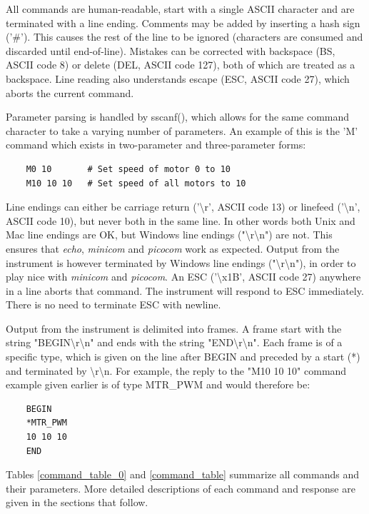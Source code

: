 \documentclass{article}
\begin{document}
All commands are human-readable, start with a single ASCII character and are terminated with a line ending.
Comments may be added by inserting a hash sign ('\#').
This causes the rest of the line to be ignored (characters are consumed and discarded until end-of-line).
Mistakes can be corrected with backspace (BS, ASCII code 8) or delete (DEL, ASCII code 127), both of which are treated as a backspace.
Line reading also understands escape (ESC, ASCII code 27), which aborts the current command.

Parameter parsing is handled by sscanf(), which allows for the same command character to take a varying number
of parameters. An example of this is the 'M' command which exists in two-parameter and three-parameter forms:

\begin{lstlisting}
    M0 10       # Set speed of motor 0 to 10
    M10 10 10   # Set speed of all motors to 10
\end{lstlisting}


Line endings can either be carriage return ('{\textbackslash}r', ASCII code 13) or linefeed ('{\textbackslash}n', ASCII code 10), but never both in the same line.
In other words both Unix and Mac line endings are OK, but Windows line endings ("{\textbackslash}r{\textbackslash}n") are not.
This ensures that {\it echo}, {\it minicom} and {\it picocom} work as expected.
Output from the instrument is however terminated by Windows line endings ("{\textbackslash}r{\textbackslash}n"), in order to play nice with {\it minicom} and {\it picocom}.
An ESC ('{\textbackslash}x1B', ASCII code 27) anywhere in a line aborts that command.
The instrument will respond to ESC immediately.
There is no need to terminate ESC with newline.

Output from the instrument is delimited into frames.
A frame start with the string "BEGIN{\textbackslash}r{\textbackslash}n" and ends with the string "END{\textbackslash}r{\textbackslash}n".
Each frame is of a specific type, which is given on the line after BEGIN and preceded by a start (*) and terminated by {\textbackslash}r{\textbackslash}n.
For example, the reply to the "M10 10 10" command example given earlier is of type MTR\_PWM and would therefore be:

\begin{lstlisting}
    BEGIN
    *MTR_PWM
    10 10 10
    END
\end{lstlisting}

Tables \ref{command_table_0} and \ref{command_table} summarize all commands and their parameters.
More detailed descriptions of each command and response are given in the sections that follow.
\end{document}
